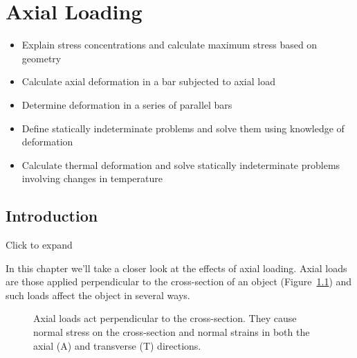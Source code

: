 \documentclass[
  letterpaper,
  DIV=11,
  numbers=noendperiod]{scrreprt}
\providecommand{\tightlist}{%
  \setlength{\itemsep}{0pt}\setlength{\parskip}{0pt}}\usepackage{longtable,booktabs,array}
\theoremstyle{definition}
\theoremstyle{remark}
\begin{document}

\chapter{Axial Loading}\label{sec-axial-loading}

\begin{tcolorbox}[enhanced jigsaw, leftrule=.75mm, bottomrule=.15mm, opacityback=0, opacitybacktitle=0.6, colframe=quarto-callout-note-color-frame, toprule=.15mm, colbacktitle=quarto-callout-note-color!10!white, coltitle=black, bottomtitle=1mm, title={Learning Objectives}, titlerule=0mm, toptitle=1mm, colback=white, rightrule=.15mm, left=2mm, arc=.35mm, breakable]

\begin{itemize}
\tightlist
\item
  Explain stress concentrations and calculate maximum stress based on
  geometry
\item
  Calculate axial deformation in a bar subjected to axial load
\item
  Determine deformation in a series of parallel bars
\item
  Define statically indeterminate problems and solve them using
  knowledge of deformation
\item
  Calculate thermal deformation and solve statically indeterminate
  problems involving changes in temperature
\end{itemize}

\end{tcolorbox}

\section*{Introduction}\label{introduction-4}


Click to expand

In this chapter we'll take a closer look at the effects of axial
loading. Axial loads are those applied perpendicular to the
cross-section of an object (Figure~\ref{fig-5.1}) and such loads affect
the object in several ways.

\begin{figure}


\caption{\label{fig-5.1}Axial loads act perpendicular to the
cross-section. They cause normal stress on the cross-section and normal
strains in both the axial (A) and transverse (T) directions.}

\end{figure}%
\end{document}
